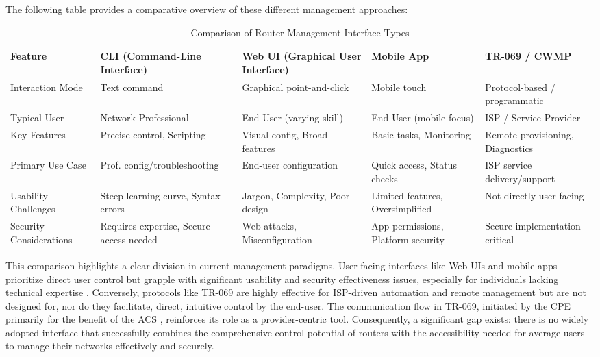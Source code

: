 The following table provides a comparative overview of these different management approaches:

\begin{table}[htbp]
\caption{Comparison of Router Management Interface Types}
\begin{tabular}{|p{3cm}|p{3cm}|p{3cm}|p{3cm}|p{3cm}|}
\hline
\textbf{Feature} & \textbf{CLI (Command-Line Interface)} & \textbf{Web UI (Graphical User Interface)} & \textbf{Mobile App} & \textbf{TR-069 / CWMP} \\ \hline
Interaction Mode & Text command & Graphical point-and-click & Mobile touch & Protocol-based / programmatic \\ \hline
Typical User & Network Professional & End-User (varying skill) & End-User (mobile focus) & ISP / Service Provider \\ \hline
Key Features & Precise control, Scripting & Visual config, Broad features & Basic tasks, Monitoring & Remote provisioning, Diagnostics \\ \hline
Primary Use Case & Prof. config/troubleshooting & End-user configuration & Quick access, Status checks & ISP service delivery/support \\ \hline
Usability Challenges & Steep learning curve, Syntax errors & Jargon, Complexity, Poor design & Limited features, Oversimplified & Not directly user-facing \\ \hline
Security Considerations & Requires expertise, Secure access needed & Web attacks, Misconfiguration & App permissions, Platform security & Secure implementation critical \\ \hline
\end{tabular}
\end{table}

This comparison highlights a clear division in current management paradigms. User-facing interfaces like Web UIs and mobile apps prioritize direct user control but grapple with significant usability and security effectiveness issues, especially for individuals lacking technical expertise \cite{home_network_challenges}. Conversely, protocols like TR-069 are highly effective for ISP-driven automation and remote management \cite{router_guide} but are not designed for, nor do they facilitate, direct, intuitive control by the end-user. The communication flow in TR-069, initiated by the CPE primarily for the benefit of the ACS \cite{router_security_vulnerabilities}, reinforces its role as a provider-centric tool. Consequently, a significant gap exists: there is no widely adopted interface that successfully combines the comprehensive control potential of routers with the accessibility needed for average users to manage their networks effectively and securely.

